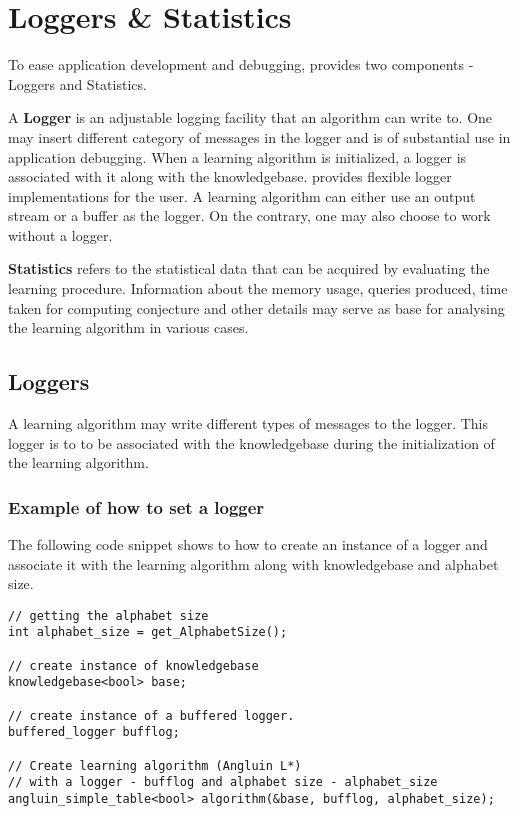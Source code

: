 \chapter{Loggers \& Statistics}

To ease application development and debugging, \libalf provides two components - Loggers and Statistics. 

A \textbf{Logger} is an adjustable logging facility that an algorithm can write to. One may insert different category of messages in the logger and is of substantial use in application debugging. When a learning algorithm is initialized, a logger is associated with it along with the knowledgebase. \libalf provides flexible logger implementations for the user. A learning algorithm can either use an output stream or a buffer as the logger. On the contrary, one may also choose to work without a logger.

\textbf{Statistics} refers to the statistical data that can be acquired by evaluating the learning procedure. Information about the memory usage, queries produced, time taken for computing conjecture and other details may serve as base for analysing the learning algorithm in various cases. 

\section{Loggers}

A learning algorithm may write different types of messages to the logger. This logger is to to be associated with the knowledgebase during the initialization of the learning algorithm. 

\subsection*{Example of how to set a logger}
The following code snippet shows to how to create an instance of a logger and associate it with the learning algorithm along with knowledgebase and alphabet size.
\begin{lstlisting}
// getting the alphabet size
int alphabet_size = get_AlphabetSize(); 

// create instance of knowledgebase
knowledgebase<bool> base; 

// create instance of a buffered logger.
buffered_logger bufflog; 

// Create learning algorithm (Angluin L*) 
// with a logger - bufflog and alphabet size - alphabet_size
angluin_simple_table<bool> algorithm(&base, bufflog, alphabet_size); 
\end{lstlisting}

